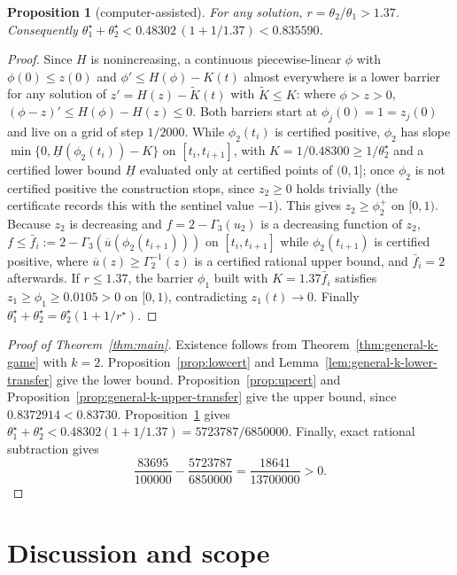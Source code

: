 \documentclass[11pt]{article}
\newtheorem{proposition}[theorem]{Proposition}
\theoremstyle{remark}
\begin{document}
\begin{proposition}[computer-assisted]\label{prop:theta}
For any solution, $r=\theta_2/\theta_1>1.37$. Consequently $\theta_1^\star+\theta_2^\star<0.48302\,(1+1/1.37)<0.835590$.
\end{proposition}
\begin{proof}
Since $H$ is nonincreasing, a continuous piecewise-linear $\phi$ with $\phi(0)\le z(0)$ and $\phi'\le H(\phi)-K(t)$ almost everywhere is a lower barrier for any solution of $z'=H(z)-\tilde K(t)$ with $\tilde K\le K$: where $\phi>z>0$, $(\phi-z)'\le H(\phi)-H(z)\le 0$. Both barriers start at $\phi_j(0)=1=z_j(0)$ and live on a grid of step $1/2000$. While $\phi_2(t_i)$ is certified positive, $\phi_2$ has slope $\min\{0,\underline H(\phi_2(t_i))-K\}$ on $[t_i,t_{i+1}]$, with $K=1/0.48300\ge 1/\theta_2^\star$ and a certified lower bound $\underline H$ evaluated only at certified points of $(0,1]$; once $\phi_2$ is not certified positive the construction stops, since $z_2\ge0$ holds trivially (the certificate records this with the sentinel value $-1$). This gives $z_2\ge\phi_2^+$ on $[0,1)$. Because $z_2$ is decreasing and $f=2-\Gamma_3(u_2)$ is a decreasing function of $z_2$, $f\le\bar f_i:=2-\Gamma_3(\overline u(\phi_2(t_{i+1})))$ on $[t_i,t_{i+1}]$ while $\phi_2(t_{i+1})$ is certified positive, where $\overline u(z)\ge\Gamma_2^{-1}(z)$ is a certified rational upper bound, and $\bar f_i=2$ afterwards. If $r\le 1.37$, the barrier $\phi_1$ built with $K=1.37\bar f_i$ satisfies $z_1\ge\phi_1\ge0.0105>0$ on $[0,1)$, contradicting $z_1(t)\to 0$. Finally $\theta_1^\star+\theta_2^\star=\theta_2^\star(1+1/r^\star)$.
\end{proof}

\begin{proof}[Proof of Theorem~\ref{thm:main}]
Existence follows from Theorem~\ref{thm:general-k-game} with $k=2$.
Proposition~\ref{prop:lowcert} and Lemma~\ref{lem:general-k-lower-transfer}
give the lower bound. Proposition~\ref{prop:upcert} and
Proposition~\ref{prop:general-k-upper-transfer} give the upper bound,
since $0.8372914<0.83730$. Proposition~\ref{prop:theta} gives
$\theta_1^\star+\theta_2^\star<0.48302(1+1/1.37)=5723787/6850000$.
Finally, exact rational subtraction gives
\[
 \frac{83695}{100000}-\frac{5723787}{6850000}
 =\frac{18641}{13700000}>0.
\]
\end{proof}
\section{Discussion and scope}\label{sec:discussion}
\end{document}
